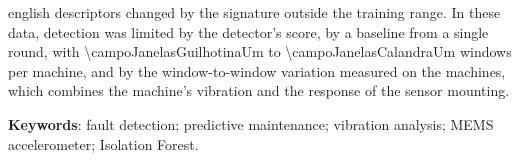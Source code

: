 \begin{resumo}[Abstract]
\begin{otherlanguage*}{english}
descriptors changed by the signature outside the training range. In these data, detection was limited by the detector's score, by a baseline from a single round, with \num{\campoJanelasGuilhotinaUm} to \num{\campoJanelasCalandraUm} windows per machine, and by the window-to-window variation measured on the machines, which combines the machine's vibration and the response of the sensor mounting.

\vspace{\onelineskip}
\noindent
\textbf{Keywords}: fault detection; predictive maintenance; vibration analysis; MEMS accelerometer; Isolation Forest.
\end{otherlanguage*}
\end{resumo}
